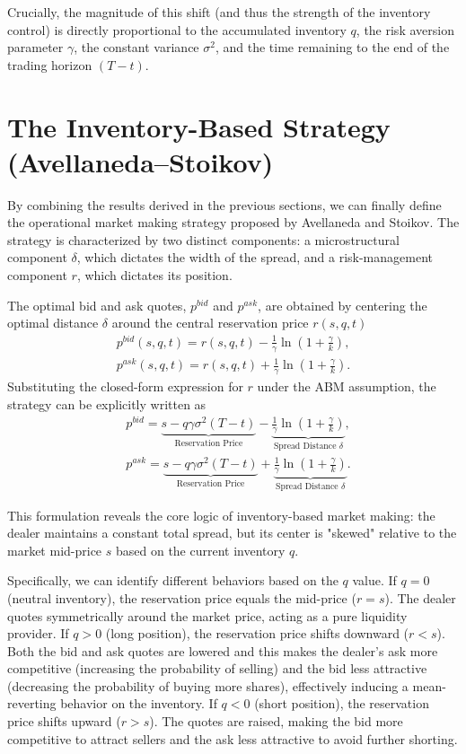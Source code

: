 \documentclass[a4paper,10pt,titlepage,oneside,openany]{book}
\theoremstyle{plain}\newtheorem{theorem}{Theorem}[chapter]
\theoremstyle{definition}\newtheorem{definition}{Definition}[chapter]
\theoremstyle{remark}\newtheorem{remark}{Remark}[chapter]
\begin{document}
Crucially, the magnitude of this shift (and thus the strength of the inventory control) is directly proportional to the accumulated inventory $q$, the risk aversion parameter $\gamma$, the constant variance $\sigma^2$, and the time remaining to the end of the trading horizon $(T-t)$.

\section{The Inventory-Based Strategy (Avellaneda--Stoikov)}
By combining the results derived in the previous sections, we can finally define the operational market making strategy proposed by Avellaneda and Stoikov. The strategy is characterized by two distinct components: a microstructural component $\delta$, which dictates the width of the spread, and a risk-management component $r$, which dictates its position.

The optimal bid and ask quotes, $p^{bid}$ and $p^{ask}$, are obtained by centering the optimal distance $\delta$ around the central reservation price $r(s,q,t)$
\begin{align*}
    p^{bid}(s,q,t) = r(s,q,t) - \frac{1}{\gamma} \ln \left( 1 + \frac{\gamma}{k} \right),\\
    p^{ask}(s,q,t) = r(s,q,t) + \frac{1}{\gamma} \ln \left( 1 + \frac{\gamma}{k} \right).
\end{align*}
Substituting the closed-form expression for $r$ under the ABM assumption, the strategy can be explicitly written as
\begin{align*}
    &p^{bid} = \underbrace{s - q\gamma\sigma^2(T-t)}_{\text{Reservation Price}} - \underbrace{\frac{1}{\gamma} \ln \left( 1 + \frac{\gamma}{k} \right)}_{\text{Spread Distance } \delta},\\
    &p^{ask} = \underbrace{s - q\gamma\sigma^2(T-t)}_{\text{Reservation Price}} + \underbrace{\frac{1}{\gamma} \ln \left( 1 + \frac{\gamma}{k} \right)}_{\text{Spread Distance } \delta}.
\end{align*}

This formulation reveals the core logic of inventory-based market making: the dealer maintains a constant total spread, but its center is "skewed" relative to the market mid-price $s$ based on the current inventory $q$. 

Specifically, we can identify different behaviors based on the $q$ value. If $q=0$ (neutral inventory), the reservation price equals the mid-price ($r=s$). The dealer quotes symmetrically around the market price, acting as a pure liquidity provider. If $q>0$ (long position), the reservation price shifts downward ($r < s$). Both the bid and ask quotes are lowered and this makes the dealer's ask more competitive (increasing the probability of selling) and the bid less attractive (decreasing the probability of buying more shares), effectively inducing a mean-reverting behavior on the inventory. If $q<0$ (short position), the reservation price shifts upward ($r > s$). The quotes are raised, making the bid more competitive to attract sellers and the ask less attractive to avoid further shorting.
\end{document}

